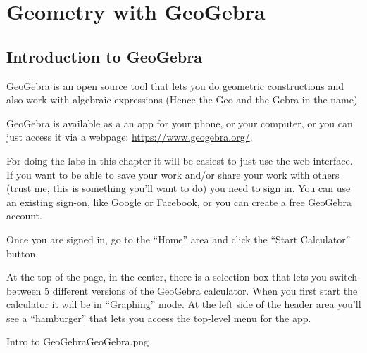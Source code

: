  
\chapter{Geometry with GeoGebra}


\section{Introduction to GeoGebra}
\label{sec:geogebra}

GeoGebra is an open source tool that lets you do geometric constructions and also work with algebraic expressions (Hence the Geo and the Gebra in the name).

GeoGebra is available as a an app for your phone, or your computer, or you can just access it via a webpage: \url{https://www.geogebra.org/}.

For doing the labs in this chapter it will be easiest to just use the web interface.  If you want to be able to save your work and/or share your work with others (trust me, this is something you'll want to do) you need to sign in.  You can use an existing sign-on, like Google or Facebook, or you can create a free GeoGebra account.  

Once you are signed in, go to the ``Home'' area and click the ``Start Calculator'' button.

At the top of the page, in the center, there is a selection box that lets you switch between 5 different versions of the GeoGebra calculator.  When you first start the calculator it will be in ``Graphing'' mode.  At the left side of the header area you'll see a ``hamburger'' that lets you access the top-level menu for the app.

\clearpage
\begin{worksheet}{14}{Intro to GeoGebra}{GeoGebra.png}

\end{worksheet}
\clearpage


